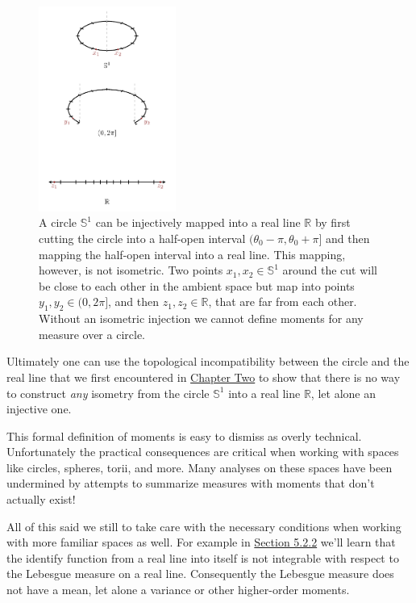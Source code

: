 \documentclass[
  letterpaper,
  DIV=11,
  numbers=noendperiod]{scrartcl}
\begin{document}
\begin{figure}

{\centering \includegraphics[width=0.4\textwidth,height=\textheight]{figures/embeddings/circle/circle.pdf}

}

\caption{\label{fig-no-circle-embedding}A circle \(\mathbb{S}^{1}\) can
be injectively mapped into a real line \(\mathbb{R}\) by first cutting
the circle into a half-open interval
\((\theta_{0} - \pi, \theta_{0} + \pi]\) and then mapping the half-open
interval into a real line. This mapping, however, is not isometric. Two
points \(x_{1}, x_{2} \in \mathbb{S}^{1}\) around the cut will be close
to each other in the ambient space but map into points
\(y_{1}, y_{2} \in (0, 2 \pi]\), and then
\(z_{1}, z_{2} \in \mathbb{R}\), that are far from each other. Without
an isometric injection we cannot define moments for any measure over a
circle.}

\end{figure}

Ultimately one can use the topological incompatibility between the
circle and the real line that we first encountered in
\href{https://betanalpha.github.io/assets/chapters_html/spaces.html}{Chapter
Two} to show that there is no way to construct \emph{any} isometry from
the circle \(\mathbb{S}^{1}\) into a real line \(\mathbb{R}\), let alone
an injective one.

This formal definition of moments is easy to dismiss as overly
technical. Unfortunately the practical consequences are critical when
working with spaces like circles, spheres, torii, and more. Many
analyses on these spaces have been undermined by attempts to summarize
measures with moments that don't actually exist!

All of this said we still to take care with the necessary conditions
when working with more familiar spaces as well. For example in
\href{@sec:practical_lebesgue}{Section 5.2.2} we'll learn that the
identify function from a real line into itself is not integrable with
respect to the Lebesgue measure on a real line. Consequently the
Lebesgue measure does not have a mean, let alone a variance or other
higher-order moments.
\end{document}
